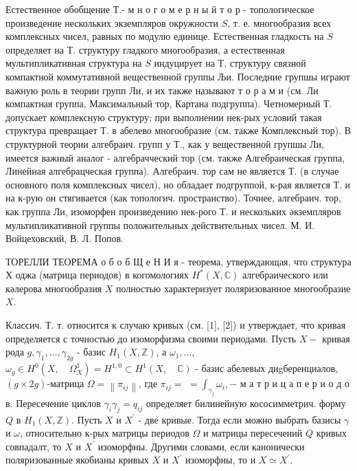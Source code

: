\documentclass[10pt]{article}
\begin{document}
Естественное обобщение Т.- м н о г о м е р н ы й т о р - топологическое произведение нескольких экземпляров окружности $S$, т. е. многообразия всех комплексных чисел, равных по модулю единице. Естественная гладкость на $S$ определяет на Т. структуру гладкого многообразия, а естественная мультипликативная структура на $S$ индуцирует на Т. структуру связной компактной коммутативной вещественной группы Љи. Последние групшы играют важную роль в теории групп Ли, и их также называют т о р а м и (см. Ли компактная группа, Максимальный тор, Картана подгруппа). Четномерный Т. допускает комплексную структуру; при выполнении нек-рых условий такая структура превращает Т. в абелево многообразие (см. также Комплексный тор). В структурной теории алгебраич. групп у Т., как у вещественной групшы Ли, имеется важный аналог - алгебрачческий тор (см. также Алгебраическая группа, Линейная алгебрацческая группа). Алгебраич. тор сам не является Т. (в случае основного поля комплексных чисел), но обладает подгруппой, к-рая является Т. и на к-рую он стягивается (как топологич. пространство). Точнее, алгебраич. тор, как группа Ли, изоморфен произведению нек-рого Т. и нескольких әкземпляров мультипликативной группы положительных действительных чисел. М. И. Войцеховский, В. Л. Попов.



ТОРЕЛЛИ ТЕОРЕМА о б о б Щ е Н И я - теорема, утверждающая, что структура Х оджа (матрица периодов) в когомологиях $H^{*}(X, \mathbb{C})$ алгебраического или кәлерова многообразия $X$ полностью характеризует поляризованное многообразие $X$.



Классич. Т. т. относится к случаю кривых (см. [1], [2]) и утверждает, что кривая определяется с точностью до изоморфизма своими периодами. Пусть $X-$ кривая рода $g, \gamma_{1}, \ldots, \gamma_{2 g}$ - базис $H_{1}(X, \mathbb{Z})$, а $\omega_{1}, \ldots$, $\omega_{g} \in H^{0}\left(X, \quad \Omega_{X}^{1}\right)=H^{1,0} \subset H^{1}(X, \quad \mathbb{C})$ - базис абелевых диgберенциалов, $(g \times 2 g)$-матрица $\Omega=\left\|\pi_{i j}\right\|$, где $\pi_{i j}=$ $=\int_{\gamma_{j}} \omega_{i},-$ м а т р и ц а п е р и о д о в. Пересечение циклов $\gamma_{i} \gamma_{j}=q_{i j}$ определяет билинейную кососимметрич. форму $Q$ в $H_{1}(X, \mathbb{Z})$. Пусть $X$ и $X^{\prime}$ - две кривые. Тогда если можно выбрать базисы $\gamma$ и $\omega$, относительно к-рых матрицы периодов $\Omega$ и матрицы пересечений $Q$ кривых совпадалт, то $X$ и $X^{\prime}$ изоморфны. Другими словами, если канонически поляризованные якобианы кривых $X$ и $X^{\prime}$ изоморфны, то и $X \simeq X^{\prime}$.
\end{document}

